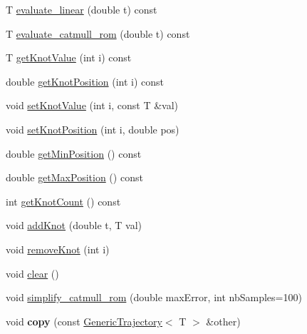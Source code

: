 \begin{DoxyCompactItemize}
\item 
T \hyperlink{classCartWheel_1_1Math_1_1GenericTrajectory_ad46b4226d45dba8e9ade6da36719665d}{evaluate\_\-linear} (double t) const 
\item 
T \hyperlink{classCartWheel_1_1Math_1_1GenericTrajectory_a1ea20f4abe766ee96d5f4bf77dd2a837}{evaluate\_\-catmull\_\-rom} (double t) const 
\item 
T \hyperlink{classCartWheel_1_1Math_1_1GenericTrajectory_a417e8fa352c64d1758d792b9b78336a3}{getKnotValue} (int i) const 
\item 
double \hyperlink{classCartWheel_1_1Math_1_1GenericTrajectory_a47285d1ca68a26683656aba3f8ddde9d}{getKnotPosition} (int i) const 
\item 
void \hyperlink{classCartWheel_1_1Math_1_1GenericTrajectory_a9e467a94f7ddb3caada5614dfb801206}{setKnotValue} (int i, const T \&val)
\item 
void \hyperlink{classCartWheel_1_1Math_1_1GenericTrajectory_ac084d4f4ff2e617c094a68ff024c83c8}{setKnotPosition} (int i, double pos)
\item 
double \hyperlink{classCartWheel_1_1Math_1_1GenericTrajectory_ab99de22b373b37caabf9dcaaf6838aca}{getMinPosition} () const 
\item 
double \hyperlink{classCartWheel_1_1Math_1_1GenericTrajectory_a244f5f4bd634ddedf127df75f904fe98}{getMaxPosition} () const 
\item 
int \hyperlink{classCartWheel_1_1Math_1_1GenericTrajectory_abd4c9c7de6f886f35b2b7cfc3e19c0d1}{getKnotCount} () const 
\item 
void \hyperlink{classCartWheel_1_1Math_1_1GenericTrajectory_a167576a75cce038f3749533d9c5ed1ec}{addKnot} (double t, T val)
\item 
void \hyperlink{classCartWheel_1_1Math_1_1GenericTrajectory_a8d71a90d3b481f9813a9700557b93cfa}{removeKnot} (int i)
\item 
void \hyperlink{classCartWheel_1_1Math_1_1GenericTrajectory_a45a40950e42d857c58a4d144ab7f01e9}{clear} ()
\item 
void \hyperlink{classCartWheel_1_1Math_1_1GenericTrajectory_a8500a009dc797436b7ccf0a5f5b6d69a}{simplify\_\-catmull\_\-rom} (double maxError, int nbSamples=100)
\item 
\hypertarget{classCartWheel_1_1Math_1_1GenericTrajectory_aaf89ed87299846dd3a84a492842a86b7}{
void {\bfseries copy} (const \hyperlink{classCartWheel_1_1Math_1_1GenericTrajectory}{GenericTrajectory}$<$ T $>$ \&other)}
\label{classCartWheel_1_1Math_1_1GenericTrajectory_aaf89ed87299846dd3a84a492842a86b7}

\end{DoxyCompactItemize}

